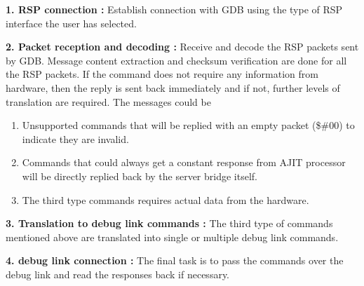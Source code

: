 \begin{description}
	\item \textbf{1. RSP connection :} Establish connection with GDB using the type of RSP interface the user has selected.
	
	\item \textbf{2. Packet reception and decoding :} Receive and decode the RSP packets sent by GDB. Message content extraction and checksum verification are done for all the RSP packets. If the command does not require any information from hardware, then the reply is sent back immediately and if not, further levels of translation are required. The messages could be
	
	\begin{enumerate}
		\item Unsupported commands that will be replied with an empty packet (\$\#00) to indicate they are invalid.
		\item Commands that could always get a constant response from AJIT processor will be  directly replied back by the server bridge itself.
		\item The third type commands requires actual data from the hardware.
	\end{enumerate}
	
	\item \textbf{3. Translation to debug link commands :} The third type of commands mentioned above are translated into single or multiple debug link commands.
	
	\item \textbf{4. debug link connection :} The final task is to pass the commands over the debug link and read the responses back if necessary.
\end{description}

